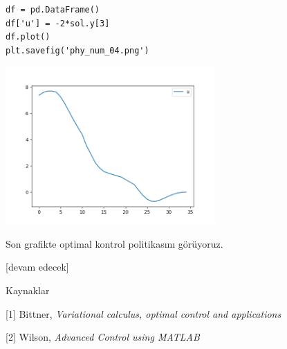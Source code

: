 \documentclass[12pt,fleqn]{article}\usepackage{../../common}
\begin{document}
\begin{verbatim}
df = pd.DataFrame()
df['u'] = -2*sol.y[3]
df.plot()
plt.savefig('phy_num_04.png')
\end{verbatim}

\includegraphics[height=6cm]{phy_num_04.png}

Son grafikte optimal kontrol politikasını görüyoruz. 

[devam edecek]

Kaynaklar

[1] Bittner, {\em Variational calculus, optimal control and applications}

[2] Wilson, {\em Advanced Control using MATLAB}
\end{document}

